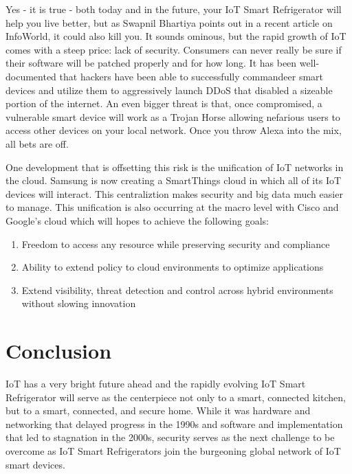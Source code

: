 \documentclass[sigconf]{acmart}
\begin{document}
Yes - it is true - both today and in the future, your IoT Smart Refrigerator will help you live better, but as Swapnil Bhartiya points out in a recent article on InfoWorld\cite{Bhartiya2017}, it could also kill you. It sounds ominous, but the rapid growth of IoT comes with a steep price: lack of security. Consumers can never really be sure if their software will be patched properly and for how long. It has been well-documented that hackers have been able to successfully commandeer smart devices and utilize them to aggressively launch DDoS that disabled a sizeable portion of the internet. An even bigger threat is that, once compromised, a vulnerable smart device will work as a Trojan Horse allowing nefarious users to access other devices on your local network. Once you throw Alexa into the mix, all bets are off. 
\par
One development that is offsetting this risk is the unification of IoT networks in the cloud. Samsung is now creating a SmartThings cloud in which all of its IoT devices will interact. This centraliztion makes security and big data much easier to manage. This unification is also occurring at the macro level with Cisco and Google's cloud\cite{Cisco2017} which will hopes to achieve the following goals:

\begin{enumerate}
  \item Freedom to access any resource while preserving security and compliance
  \item Ability to extend policy to cloud environments to optimize applications
  \item Extend visibility, threat detection and control across hybrid environments without slowing innovation
\end{enumerate}

\section{Conclusion}

IoT has a very bright future ahead and the rapidly evolving IoT Smart Refrigerator will serve as the centerpiece not only to a smart, connected kitchen, but to a smart, connected, and secure home. While it was hardware and networking that delayed progress in the 1990s and software and implementation that led to stagnation in the 2000s, security serves as the next challenge to be overcome as IoT Smart Refrigerators join the burgeoning global network of IoT smart devices.


 
\end{document}
